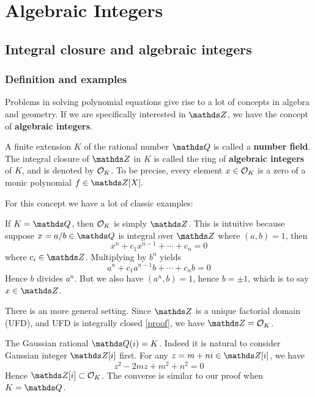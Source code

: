 \chapter{Algebraic Integers}
	\setcounter{page}{1}
	\section{Integral closure and algebraic integers}
		\subsection{Definition and examples}
			Problems in solving polynomial equations give rise to a lot of concepts in algebra and geometry. If we are specifically interested in $\mds{Z}$, we have the concept of \textbf{algebraic integers}.
			\begin{definition}
				A finite extension $K$ of the rational number $\mds{Q}$ is called a \textbf{number field}. The integral closure of $\mds{Z}$ in $K$ is called the ring of \textbf{algebraic integers} of $K$, and is denoted by $\mathcal{O}_K$. To be precise, every element $x \in \mathcal{O}_K$ is a zero of a monic polynomial $f \in \Z[X].$
			\end{definition}
			
			For this concept we have a lot of classic examples:
			
			\begin{example}
				If $K=\Q$, then $\mathcal{O}_K$ is simply $\Z$. This is intuitive because suppose $x=a/b \in \Q$ is integral over $\Z$ where $(a,b)=1$, then
				\[
				x^n+c_1x^{n-1}+\cdots+c_n = 0
				\]
				where $c_i \in \Z$. Multiplying by $b^n$ yields
				\[
				a^n+c_1a^{n-1}b+\cdots+c_nb = 0
				\]
				Hence $b$ divides $a^n$. But we also have $(a^n,b)=1$, hence $b=\pm 1$, which is to say $x \in \Z$.
				
				There is an more general setting. Since $\Z$ is a unique factorial domain (UFD), and UFD is integrally closed \href{https://proofwiki.org/wiki/Unique_Factorization_Domain_is_Integrally_Closed}{[proof]}, we have $\Z=\OK$. 
			\end{example}
			
			\begin{example}
				The Gaussian rational $\Q(i)=K$. Indeed it is natural to consider Gaussian integer $\Z[i]$ first. For any $z=m+ni \in \Z[i]$, we have
				\[
				z^2-2mz+m^2+n^2=0
				\]
				Hence $\Z[i] \subset \OK$. The converse is similar to our proof when $K=\Q$.
			\end{example}
			
